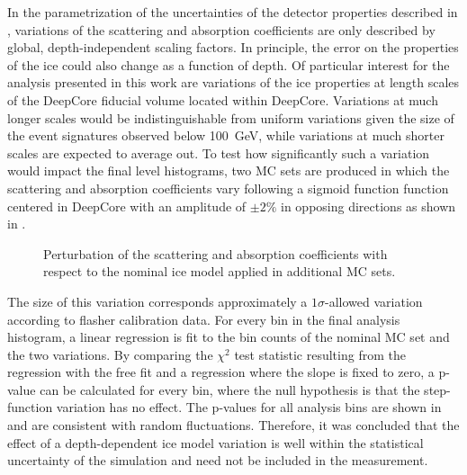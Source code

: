 In the parametrization of the uncertainties of the detector properties described in , variations of the scattering and absorption coefficients are only described by global, depth-independent scaling factors.
In principle, the error on the properties of the ice could also change as a function of depth.
Of particular interest for the analysis presented in this work are variations of the ice properties at length scales of the DeepCore fiducial volume located within DeepCore.
Variations at much longer scales would be indistinguishable from uniform variations given the size of the event signatures observed below 100~GeV, while variations at much shorter scales are expected to average out.
To test how significantly such a variation would impact the final level histograms, two MC sets are produced in which the scattering and absorption coefficients vary following a sigmoid function function centered in DeepCore with an amplitude of $\pm 2\%$ in opposing directions as shown in .
\begin{figure}
    \centering
    
    \caption{Perturbation of the scattering and absorption coefficients with respect to the nominal ice model applied in additional MC sets.}
    \label{fig:step-function-ice-model}
\end{figure}
The size of this variation corresponds approximately a $1\sigma$-allowed variation according to flasher calibration data.
For every bin in the final analysis histogram, a linear regression is fit to the bin counts of the nominal MC set and the two variations.
By comparing the $\chi^2$ test statistic resulting from the regression with the free fit and a regression where the slope is fixed to zero, a p-value can be calculated for every bin, where the null hypothesis is that the step-function variation has no effect.
The p-values for all analysis bins are shown in  and are consistent with random fluctuations.
Therefore, it was concluded that the effect of a depth-dependent ice model variation is well within the statistical uncertainty of the simulation and need not be included in the measurement.
